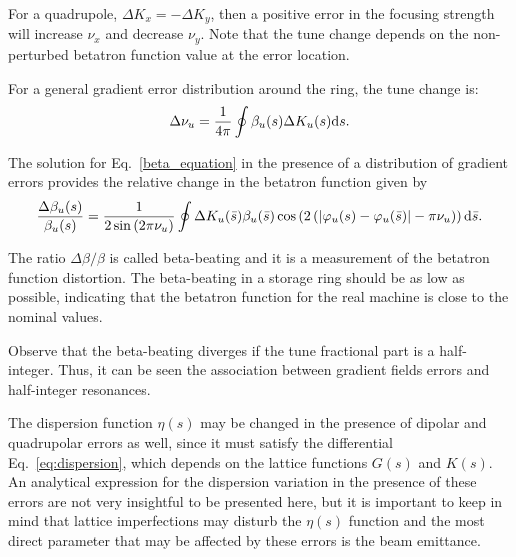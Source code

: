 For a quadrupole, $\Delta K_x = - \Delta K_y$, then a positive error in the focusing strength will increase $\nu_x$ and decrease $\nu_y$. Note that the tune change depends on the non-perturbed betatron function value at the error location.

For a general gradient error distribution around the ring, the tune change is:
\begin{equation}
    \Delta \nu_u = \dfrac{1}{4 \pi} \oint \beta_u ({s}) \Delta K_u ({s})\mathrm{d} {s}.
    \label{eq:tune_shift}
\end{equation}

The solution for Eq.~\eqref{beta_equation} in the presence of a distribution of gradient errors provides the relative change in the betatron function given by
\begin{equation}
    \dfrac{\Delta \beta_u(s)}{\beta_u(s)} = \dfrac{1}{2\sin\left(2\pi \nu_u\right)} \oint \Delta K_u(\bar{s}) \beta_u(\bar{s}) \cos\left(2\left(|\varphi_{u}(s) - \varphi_{u}(\bar{s})| - \pi\nu_{u} \right)\right) \mathrm{d} \bar{s}.
\end{equation}

The ratio $\Delta \beta/\beta$ is called beta-beating and it is a measurement of the betatron function distortion. The beta-beating in a storage ring should be as low as possible, indicating that the betatron function for the real machine is close to the nominal values.

Observe that the beta-beating diverges if the tune fractional part is a half-integer. Thus, it can be seen the association between gradient fields errors and half-integer resonances.

The dispersion function $\eta(s)$ may be changed in the presence of dipolar and quadrupolar errors as well, since it must satisfy the differential Eq.~\eqref{eq:dispersion}, which depends on the lattice functions $G(s)$ and $K(s)$. An analytical expression for the dispersion variation in the presence of these errors are not very insightful to be presented here, but it is important to keep in mind that lattice imperfections may disturb the $\eta(s)$ function and the most direct parameter that may be affected by these errors is the beam emittance.
